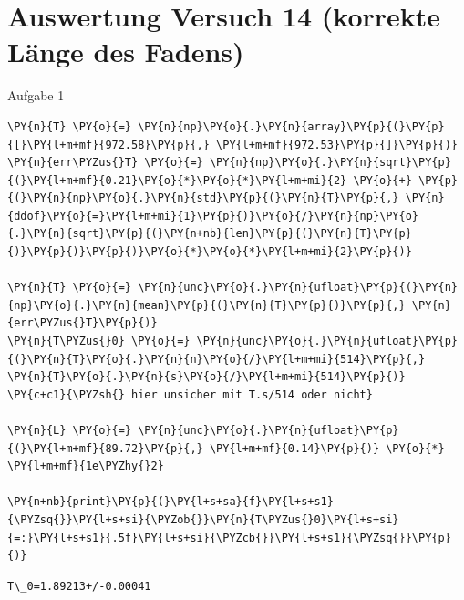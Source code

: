 
\section{Auswertung Versuch 14 (korrekte Länge des Fadens)}

    Aufgabe 1

    \begin{tcolorbox}[breakable, size=fbox, boxrule=1pt, pad at break*=1mm,colback=cellbackground, colframe=cellborder]
\begin{Verbatim}[commandchars=\\\{\}]
\PY{n}{T} \PY{o}{=} \PY{n}{np}\PY{o}{.}\PY{n}{array}\PY{p}{(}\PY{p}{[}\PY{l+m+mf}{972.58}\PY{p}{,} \PY{l+m+mf}{972.53}\PY{p}{]}\PY{p}{)}
\PY{n}{err\PYZus{}T} \PY{o}{=} \PY{n}{np}\PY{o}{.}\PY{n}{sqrt}\PY{p}{(}\PY{l+m+mf}{0.21}\PY{o}{*}\PY{o}{*}\PY{l+m+mi}{2} \PY{o}{+} \PY{p}{(}\PY{n}{np}\PY{o}{.}\PY{n}{std}\PY{p}{(}\PY{n}{T}\PY{p}{,} \PY{n}{ddof}\PY{o}{=}\PY{l+m+mi}{1}\PY{p}{)}\PY{o}{/}\PY{n}{np}\PY{o}{.}\PY{n}{sqrt}\PY{p}{(}\PY{n+nb}{len}\PY{p}{(}\PY{n}{T}\PY{p}{)}\PY{p}{)}\PY{p}{)}\PY{o}{*}\PY{o}{*}\PY{l+m+mi}{2}\PY{p}{)}

\PY{n}{T} \PY{o}{=} \PY{n}{unc}\PY{o}{.}\PY{n}{ufloat}\PY{p}{(}\PY{n}{np}\PY{o}{.}\PY{n}{mean}\PY{p}{(}\PY{n}{T}\PY{p}{)}\PY{p}{,} \PY{n}{err\PYZus{}T}\PY{p}{)}
\PY{n}{T\PYZus{}0} \PY{o}{=} \PY{n}{unc}\PY{o}{.}\PY{n}{ufloat}\PY{p}{(}\PY{n}{T}\PY{o}{.}\PY{n}{n}\PY{o}{/}\PY{l+m+mi}{514}\PY{p}{,} \PY{n}{T}\PY{o}{.}\PY{n}{s}\PY{o}{/}\PY{l+m+mi}{514}\PY{p}{)}
\PY{c+c1}{\PYZsh{} hier unsicher mit T.s/514 oder nicht}

\PY{n}{L} \PY{o}{=} \PY{n}{unc}\PY{o}{.}\PY{n}{ufloat}\PY{p}{(}\PY{l+m+mf}{89.72}\PY{p}{,} \PY{l+m+mf}{0.14}\PY{p}{)} \PY{o}{*} \PY{l+m+mf}{1e\PYZhy{}2}

\PY{n+nb}{print}\PY{p}{(}\PY{l+s+sa}{f}\PY{l+s+s1}{\PYZsq{}}\PY{l+s+si}{\PYZob{}}\PY{n}{T\PYZus{}0}\PY{l+s+si}{=:}\PY{l+s+s1}{.5f}\PY{l+s+si}{\PYZcb{}}\PY{l+s+s1}{\PYZsq{}}\PY{p}{)}
\end{Verbatim}
\end{tcolorbox}

    \begin{Verbatim}[commandchars=\\\{\}]
T\_0=1.89213+/-0.00041
    \end{Verbatim}

